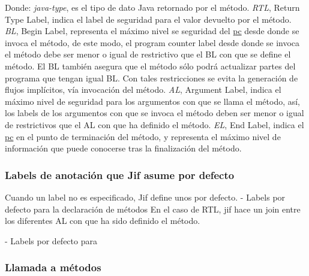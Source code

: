 Donde: \emph{java-type}, es el tipo de dato Java retornado por el
método.\newline 
\emph{RTL}, Return Type Label, indica el label de seguridad para el valor
devuelto por el método.\newline 
\emph{BL}, Begin Label, representa el máximo nivel se seguridad del
\underline{pc} desde donde se invoca el método, de este modo,
el program counter label desde donde se invoca el método debe ser menor o igual
de restrictivo que el BL con que se define el método. El BL también asegura que
el método sólo podrá actualizar partes del programa que tengan igual BL. Con
tales restricciones se evita la generación de flujos implícitos, vía invocación
del método.\newline
\emph{AL}, Argument Label, indica el máximo nivel de seguridad para los
argumentos con que se llama el método, así, los labels de los argumentos con que se
invoca el método deben ser menor o igual de restrictivos que el AL con que ha
definido el método.\newline 
\emph{EL}, End Label, indica el \underline{pc} en el punto de terminación del
método, y representa el máximo nivel de información que puede conocerse tras la
finalización del método.

\subsubsection{Labels de anotación que Jif asume por defecto}
\label{sssec:default-labels}
Cuando un label no es especificado, Jif define unos por defecto. 
- Labels por defecto para la declaración de métodos\newline
En el caso de
RTL, jif hace un join entre los diferentes AL con que ha sido definido el
método.

- Labels por defecto para \newline

\subsubsection{Llamada a métodos}